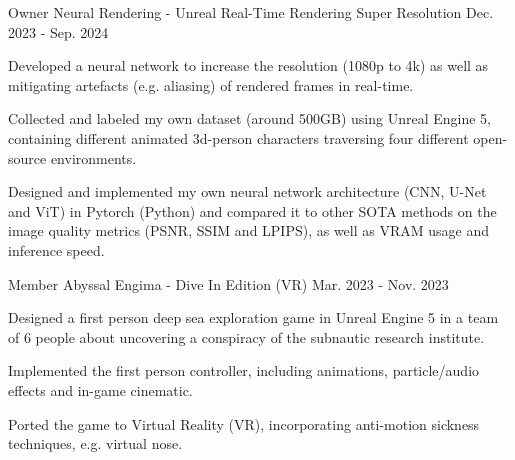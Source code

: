 

\begin{cventries}

  \cventry
    {Owner} %
    {Neural Rendering - Unreal Real-Time Rendering Super Resolution} %
    {\href{https://github.com/BrandnerKasper/URTSR}{\faGithubSquare}} %
    {Dec. 2023 - Sep. 2024} %
    {
      \begin{cvitems} %
        \item {Developed a neural network to increase the resolution (1080p to 4k) as well as mitigating artefacts (e.g. aliasing) of rendered frames in real-time.}
        \item {Collected and labeled my own dataset (around 500GB) using Unreal Engine 5, containing different animated 3d-person characters traversing four different open-source environments.}
        \item {Designed and implemented my own neural network architecture (CNN, U-Net and ViT) in Pytorch (Python) and compared it to other SOTA methods on the image quality metrics (PSNR, SSIM and LPIPS), as well as VRAM usage and inference speed.}
      \end{cvitems}
    }

  \cventry
    {Member} %
    {Abyssal Engima - Dive In Edition (VR)} %
    {\href{https://miggli.itch.io/abyssal-enigma}{\faGamepad}} %
    {Mar. 2023 - Nov. 2023} %
    {
      \begin{cvitems} %
        \item {Designed a first person deep sea exploration game in Unreal Engine 5 in a team of 6 people about uncovering a conspiracy of the subnautic research institute.}
        \item {Implemented the first person controller, including animations, particle/audio effects and in-game cinematic.}
        \item {Ported the game to Virtual Reality (VR), incorporating anti-motion sickness techniques, e.g. virtual nose.}
      \end{cvitems}
    }


\end{cventries}
